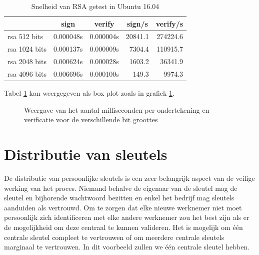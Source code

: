 \begin{table}[H]
	\centering
	\begin{tabular}{ l | l | l | r | r }
		& \multicolumn{1}{c}{sign} & \multicolumn{1}{c}{verify} &
		\multicolumn{1}{c}{sign/s} & \multicolumn{1}{c}{verify/s} \\
		\hline
		rsa  512 bits & 0.000048s & 0.000004s &  20841.1 & 274224.6 \\
		rsa 1024 bits & 0.000137s & 0.000009s &   7304.4 & 110915.7 \\
		rsa 2048 bits & 0.000624s & 0.000028s &   1603.2 &  36341.9 \\
		rsa 4096 bits & 0.006696s & 0.000100s &    149.3 &   9974.3 \\
	\end{tabular}
	\caption{Snelheid van RSA getest in Ubuntu 16.04}
	\label{tab:rsa-speed-test}
\end{table}

Tabel \ref{tab:rsa-speed-test} kan weergegeven als box plot zoals in grafiek
\ref{fig:rsa-sign-verify-speed-graph}.

\begin{figure}[H]
	\centering
	\caption{Weergave van het aantal milliseconden per ondertekening en verificatie voor de verschillende bit groottes}
	\label{fig:rsa-sign-verify-speed-graph}
\end{figure}

\section{Distributie van sleutels}
\label{sec:distributie-van-sleutels}

De distributie van persoonlijke sleutels is een zeer belangrijk aspect van de
veilige werking van het proces. Niemand behalve de eigenaar van de sleutel mag
de sleutel en bijhorende wachtwoord bezitten en enkel het bedrijf mag sleutels
aanduiden als vertrouwd. Om te zorgen dat elke nieuwe werknemer niet moet
persoonlijk zich identificeren met elke andere werknemer zou het best zijn als
er de mogelijkheid om deze centraal te kunnen valideren. Het is mogelijk om één
centrale sleutel compleet te vertrouwen of om meerdere centrale sleutels
marginaal te vertrouwen. In dit voorbeeld zullen we één centrale sleutel hebben.

